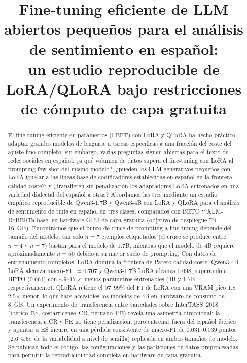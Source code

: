 \documentclass[conference]{IEEEtran}
\title{Fine-tuning eficiente de LLM abiertos pequeños para el análisis de sentimiento en español:\\
un estudio reproducible de LoRA/QLoRA bajo restricciones de cómputo de capa gratuita}
\author{
    \IEEEauthorblockN{Beltrán Sánchez Careaga}
    \IEEEauthorblockA{%
        \textit{Universidad Pontificia de Comillas -- ICAI}\\
        202216017@alu.comillas.edu
    }
}
\begin{document}
\maketitle


\begin{abstract}
El fine-tuning eficiente en parámetros (PEFT) con LoRA y QLoRA ha hecho
práctico adaptar grandes modelos de lenguaje a tareas específicas a una
fracción del coste del ajuste fino completo; sin embargo, varias preguntas
siguen abiertas para el texto de redes sociales en español: ¿a qué volumen de
datos supera el fine-tuning con LoRA al prompting few-shot del mismo modelo?;
¿pueden los LLM generativos pequeños con LoRA igualar a las líneas base de
codificadores establecidas en español en la frontera calidad-coste?; y
¿transfieren sin penalización los adaptadores LoRA entrenados en una variedad
dialectal del español a otras?
Abordamos las tres mediante un estudio empírico reproducible de Qwen3-1.7B y
Qwen3-4B con LoRA y QLoRA para el análisis de sentimiento de tuits en español
en tres clases, comparados con BETO y XLM-RoBERTa-base, en hardware GPU de
capa gratuita (objetivo de despliegue T4 16~GB).
Encontramos que el punto de cruce de prompting a fine-tuning depende del tamaño
del modelo: tan solo $n=7$ ejemplos etiquetados (el cruce se produce entre
$n=4$ y $n=7$) bastan para el modelo de 1.7B,
mientras que el modelo de 4B requiere aproximadamente $n=50$ debido a su mayor
suelo de prompting.
Con datos de entrenamiento completos, LoRA domina la frontera de Pareto
calidad-coste: Qwen3-4B LoRA alcanza macro-F1~$= 0.707$ y Qwen3-1.7B LoRA
alcanza $0.698$, superando a BETO ($0.661$) con ${\sim}9$--$17\times$ menos
parámetros entrenables (4B y 1.7B respectivamente).
QLoRA retiene el 97--99\% del F1 de LoRA con una VRAM pico 1.8--2.5$\times$
menor, lo que hace accesibles los modelos de 4B en hardware de consumo de
8~GB.
Un experimento de transferencia entre variedades sobre InterTASS~2018
(ibérico~ES, costarricense~CR, peruano~PE) revela una asimetría direccional: la
transferencia a CR y PE no tiene penalización, pero entrenar fuera del español
ibérico y apuntar a ES incurre en una pérdida consistente de macro-F1 de
0.031--0.039 puntos (2.6--4.6$\sigma$ de la variabilidad a nivel de semilla)
replicada en ambos tamaños de modelo.
Se publican todo el código, las configuraciones y las particiones de datos
preprocesadas para permitir la reproducibilidad completa en hardware de capa
gratuita.
\end{abstract}
\end{document}
